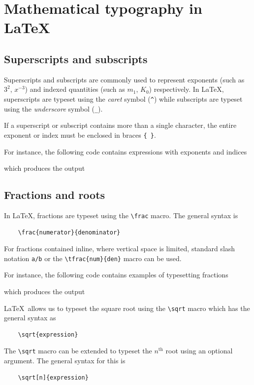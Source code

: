\section{Mathematical typography in \LaTeX}

	\subsection{Superscripts and subscripts}
		Superscripts and subscripts are commonly used to represent exponents (such as $3^2$, $x^{-3}$) and indexed quantities (such as $m_1$, $K_0$) respectively. In \LaTeX, superscripts are typeset using the \emph{caret} symbol (\lstinline|^|) while subscripts are typeset using the \emph{underscore} symbol (\lstinline|_|).
		
		If a superscript or subscript contains more than a single character, the entire exponent or index must be enclosed in braces \lstinline|{ }|.
		
		For instance, the following code contains expressions with exponents and indices

		which produces the output
	
	\subsection{Fractions and roots}
		In \LaTeX, fractions are typeset using the \lstinline|\frac| macro. The general syntax is
\begin{lstlisting}
	\frac{numerator}{denominator}
\end{lstlisting}
		For fractions contained inline, where vertical space is limited, standard slash notation \lstinline|a/b| or the \lstinline|\tfrac{num}{den}| macro can be used.
		
		For instance, the following code contains examples of typesetting fractions

		which produces the output
		
		\LaTeX\ allows us to typeset the square root using the \lstinline|\sqrt| macro which has the general syntax as
\begin{lstlisting}
	\sqrt{expression}
\end{lstlisting}
		The \lstinline|\sqrt| macro can be extended to typeset the $n^\text{th}$ root using an optional argument. The general syntax for this is
\begin{lstlisting}
	\sqrt[n]{expression}
\end{lstlisting}
		
